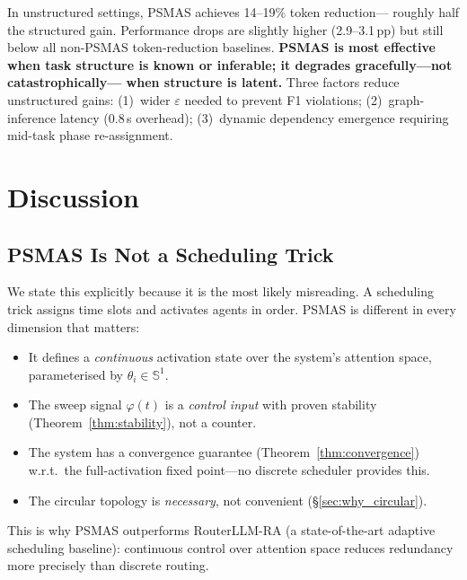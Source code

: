 \documentclass[10pt,twocolumn]{article}
\theoremstyle{plain}
\theoremstyle{definition}
\theoremstyle{remark}
\newcommand{\eps}{\varepsilon}
\newcommand{\phase}{\theta}
\newcommand{\sweep}{\varphi}
\newcommand{\Sone}{\mathbb{S}^1}
\begin{document}
\begin{tcolorbox}[warning={Honest Assessment}]
In unstructured settings, PSMAS achieves 14--19\% token reduction---
roughly half the structured gain.  Performance drops are slightly
higher (2.9--3.1\,pp) but still below all non-PSMAS token-reduction
baselines.  \textbf{PSMAS is most effective when task structure is
known or inferable; it degrades gracefully---not catastrophically---
when structure is latent.}
Three factors reduce unstructured gains:
(1)~wider $\eps$ needed to prevent F1 violations;
(2)~graph-inference latency (0.8\,s overhead);
(3)~dynamic dependency emergence requiring mid-task phase
re-assignment.
\end{tcolorbox}

\section{Discussion}
\label{sec:discussion}

\subsection{PSMAS Is Not a Scheduling Trick}

We state this explicitly because it is the most likely misreading.
A scheduling trick assigns time slots and activates agents in order.
PSMAS is different in every dimension that matters:
\begin{itemize}[leftmargin=1em,itemsep=0pt]
\item It defines a \emph{continuous} activation state over the
      system's attention space, parameterised by $\phase_i\in\Sone$.
\item The sweep signal $\sweep(t)$ is a \emph{control input} with
      proven stability (Theorem~\ref{thm:stability}), not a counter.
\item The system has a convergence guarantee
      (Theorem~\ref{thm:convergence}) w.r.t.\ the full-activation
      fixed point---no discrete scheduler provides this.
\item The circular topology is \emph{necessary}, not convenient
      (\S\ref{sec:why_circular}).
\end{itemize}
This is why PSMAS outperforms RouterLLM-RA (a state-of-the-art
adaptive scheduling baseline): continuous control over attention space
reduces redundancy more precisely than discrete routing.
\end{document}
